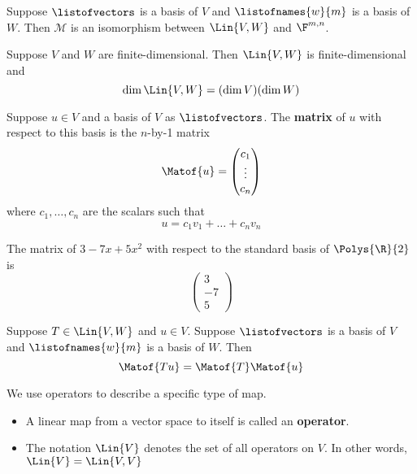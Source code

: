 \begin{theorem}
   Suppose $\listofvectors$ is a basis of $V$ and $\listofnames{w}{m}$
   is a basis of $W$. Then $\mathcal{M}$ is an isomorphism
   between $\Lin{V, W}$ and $\F^{m, n}$.

\end{theorem}

\begin{theorem}
   Suppose $V$ and $W$ are finite-dimensional. Then $\Lin{V, W}$ is
   finite-dimensional and 
   \[ \dim \Lin{V, W} = (\dim V)(\dim W) \]
\end{theorem}

\begin{definition} 
   Suppose $u \in V$ and a basis of $V$ as $\listofvectors$. The
   \textbf{matrix} of $u$ with respect to this basis is the $n$-by-1 matrix
   \[ \Matof{u} = 
   \begin{pmatrix}
      c_1 \\ \vdots \\ c_n
   \end{pmatrix} \]
   where $c_1, \dots, c_n$ are the scalars such that
   \[ u = c_1v_1 + \dots + c_nv_n \]
\end{definition}

\begin{example}
   The matrix of $3 - 7x + 5x^2$ with respect to the 
   standard basis of $\Polys{\R}{2}$ is
   \[\begin{pmatrix}
      3 \\ -7 \\ 5
   \end{pmatrix} \]
\end{example}

\begin{theorem} 
   Suppose $T \in \Lin{V, W}$ and $u \in V$. Suppose $\listofvectors$
   is a basis of $V$ and $\listofnames{w}{m}$ is a basis of $W$. Then
   \[ \Matof{Tu} = \Matof{T}\Matof{u} \]
\end{theorem}

\begin{definition} 
   We use operators to describe a specific type of map. 
   \begin{itemize}
      \item A linear map from a vector space to itself is called an \textbf{operator}.
      \item The notation $\Lin{V}$ denotes the set of all operators on $V$. In other words,
      $\Lin{V} = \Lin{V, V}$
   \end{itemize}
\end{definition}

